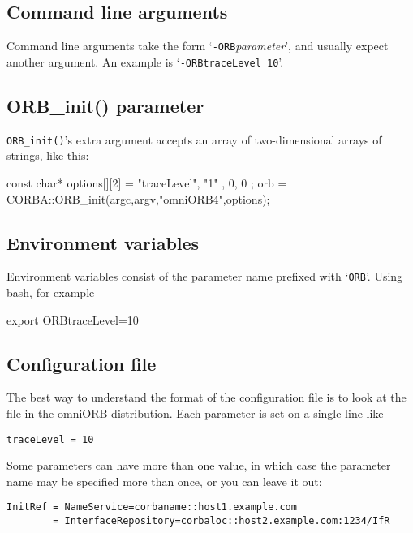\documentclass[11pt,twoside,a4paper]{book}
\newcommand{\op}[1]{\texttt{#1()}}
\newcommand{\cmdline}[1]{\texttt{#1}}
\newcommand{\file}{\begingroup \urlstyle{tt}\Url}
\begin{document}
\subsection{Command line arguments}

Command line arguments take the form
`\cmdline{-ORB}\textit{parameter}', and usually expect another
argument. An example is `\cmdline{-ORBtraceLevel 10}'.


\subsection{ORB\_init() parameter}

\op{ORB\_init}'s extra argument accepts an array of two-dimensional
arrays of strings, like this:

\begin{cxxlisting}
const char* options[][2] = { { "traceLevel", "1" }, { 0, 0 } }; 
orb = CORBA::ORB_init(argc,argv,"omniORB4",options); 
\end{cxxlisting}


\subsection{Environment variables}

Environment variables consist of the parameter name prefixed with
`\cmdline{ORB}'. Using bash, for example

\begin{makelisting}
export ORBtraceLevel=10
\end{makelisting}


\subsection{Configuration file}

The best way to understand the format of the configuration file is to
look at the \file{sample.cfg} file in the omniORB distribution. Each
parameter is set on a single line like

\begin{verbatim}
traceLevel = 10
\end{verbatim}

Some parameters can have more than one value, in which case the
parameter name may be specified more than once, or you can leave it
out:

\begin{verbatim}
InitRef = NameService=corbaname::host1.example.com
        = InterfaceRepository=corbaloc::host2.example.com:1234/IfR
\end{verbatim}
\end{document}

